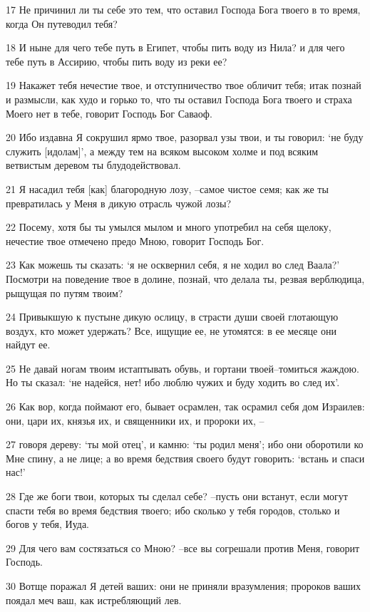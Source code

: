 \par 17 Не причинил ли ты себе это тем, что оставил Господа Бога твоего в то время, когда Он путеводил тебя?
\par 18 И ныне для чего тебе путь в Египет, чтобы пить воду из Нила? и для чего тебе путь в Ассирию, чтобы пить воду из реки ее?
\par 19 Накажет тебя нечестие твое, и отступничество твое обличит тебя; итак познай и размысли, как худо и горько то, что ты оставил Господа Бога твоего и страха Моего нет в тебе, говорит Господь Бог Саваоф.
\par 20 Ибо издавна Я сокрушил ярмо твое, разорвал узы твои, и ты говорил: `не буду служить [идолам]', а между тем на всяком высоком холме и под всяким ветвистым деревом ты блудодействовал.
\par 21 Я насадил тебя [как] благородную лозу, --самое чистое семя; как же ты превратилась у Меня в дикую отрасль чужой лозы?
\par 22 Посему, хотя бы ты умылся мылом и много употребил на себя щелоку, нечестие твое отмечено предо Мною, говорит Господь Бог.
\par 23 Как можешь ты сказать: `я не осквернил себя, я не ходил во след Ваала?' Посмотри на поведение твое в долине, познай, что делала ты, резвая верблюдица, рыщущая по путям твоим?
\par 24 Привыкшую к пустыне дикую ослицу, в страсти души своей глотающую воздух, кто может удержать? Все, ищущие ее, не утомятся: в ее месяце они найдут ее.
\par 25 Не давай ногам твоим истаптывать обувь, и гортани твоей--томиться жаждою. Но ты сказал: `не надейся, нет! ибо люблю чужих и буду ходить во след их'.
\par 26 Как вор, когда поймают его, бывает осрамлен, так осрамил себя дом Израилев: они, цари их, князья их, и священники их, и пророки их, --
\par 27 говоря дереву: `ты мой отец', и камню: `ты родил меня'; ибо они оборотили ко Мне спину, а не лице; а во время бедствия своего будут говорить: `встань и спаси нас!'
\par 28 Где же боги твои, которых ты сделал себе? --пусть они встанут, если могут спасти тебя во время бедствия твоего; ибо сколько у тебя городов, столько и богов у тебя, Иуда.
\par 29 Для чего вам состязаться со Мною? --все вы согрешали против Меня, говорит Господь.
\par 30 Вотще поражал Я детей ваших: они не приняли вразумления; пророков ваших поядал меч ваш, как истребляющий лев.
